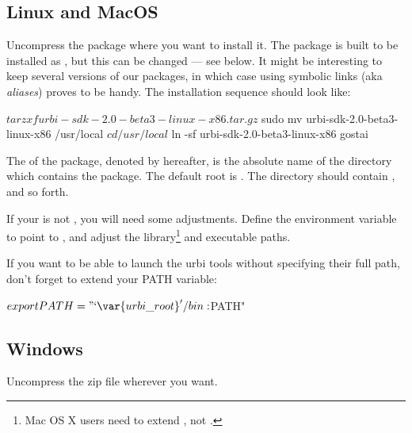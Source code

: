 \subsection{Linux and MacOS}

Uncompress the package where you want to install it.  The package is
built to be installed as , but this can be
changed --- see below.  It might be interesting to keep several
versions of our packages, in which case using symbolic links (aka
\emph{aliases}) proves to be handy.  The installation sequence should
look like:

\begin{shell}
$ tar zxf urbi-sdk-2.0-beta3-linux-x86.tar.gz
$ sudo mv urbi-sdk-2.0-beta3-linux-x86 /usr/local
$ cd /usr/local
$ ln -sf urbi-sdk-2.0-beta3-linux-x86 gostai
\end{shell}

The  of the package, denoted by  hereafter,
is the absolute name of the directory which contains the package.  The
default root is .  The directory
 should contain ,  and so forth.

If your  is not , you will need
some adjustments.  Define the environment variable  to point to
, and adjust the library\footnote{%
  Mac OS X users need to extend , not
  .
} and executable paths.


If you want to be able to launch the urbi tools without specifying
their full path, don't forget to extend your PATH variable:

\begin{shell}[escapeinside=`']
$ export PATH="`'/bin:$PATH"
\end{shell}%

\subsection{Windows}

Uncompress the zip file wherever you want.

